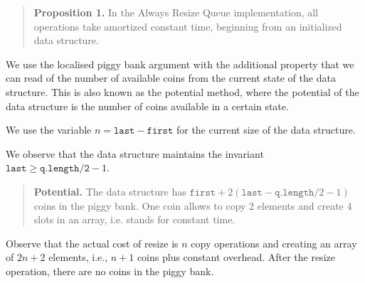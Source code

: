 \documentclass{tufte-handout}
\begin{document}
\begin{quote}
  {\bf Proposition 1.} In the Always Resize Queue implementation, all operations take amortized constant time, beginning from an initialized data structure.
\end{quote}

We use the localised piggy bank argument with the additional property that we can read of the number of available coins from the current state of the data structure.
This is also known as the potential method, where the potential of the data structure is the number of coins available in a certain state.

We use the variable $n = \texttt{last} - \texttt{first}$ for the current size of the data structure.

We observe that the data structure maintains the invariant $\texttt{last} \geq \texttt{q.length/2} -1$. 
\begin{quote}
  {\bf Potential.} The data structure has $\texttt{first} + 2(\texttt{last} - \texttt{q.length}/2 -1)$ coins in the piggy bank.
  One coin allows to copy 2 elements and create 4 slots in an array, i.e. stands for constant time.
\end{quote}

Observe that the actual cost of resize is $n$ copy operations and creating an array of $2n+2$ elements, i.e., $n+1$ coins plus constant overhead.
After the resize operation, there are no coins in the piggy bank.
\end{document}
